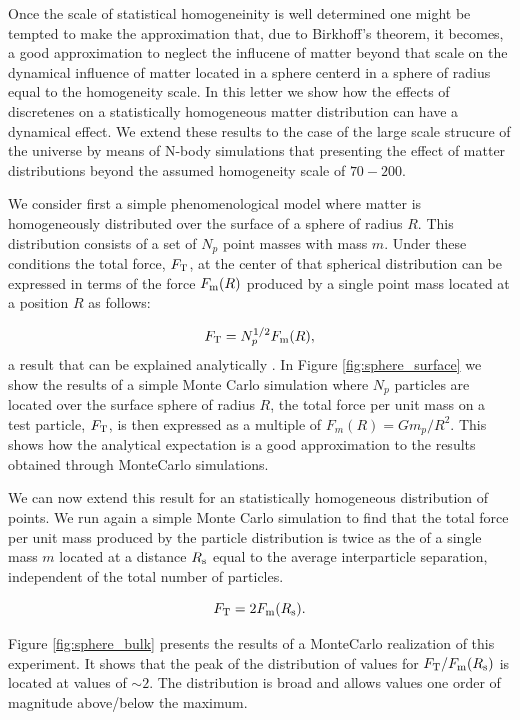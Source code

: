 \documentclass{article}
\newcommand{\hMpc}{{\ifmmode{h^{-1}{\rm Mpc}}\else{$h^{-1}$Mpc }\fi}}
\begin{document}
Once the scale of statistical homogeneinity is well determined one
might be tempted to make the approximation that,
due to Birkhoff's theorem, it becomes, a good approximation to neglect
the influcene of matter beyond that scale on the dynamical influence
of matter located in a sphere centerd in a sphere of radius equal to
the homogeneity scale.  In this letter we show how the effects of
discretenes on a statistically homogeneous matter distribution can
have a dynamical effect. We extend these results to the case of the
large scale strucure of the universe by means of N-body simulations
that presenting the effect of matter distributions beyond the assumed
homogeneity scale of $70-200$\hMpc.
 


 We consider first a simple phenomenological model where matter is
homogeneously distributed over the surface of a sphere of radius
$R$. This distribution consists of a set of $N_p$ point masses with mass
$m$. Under these conditions the total force, $F_{\rm T}$, at the
center of that spherical distribution can be expressed in terms of the
force $F_{\rm m}(R)$ produced by a single point mass located at a
position  $R$ as follows:  

\begin{equation}
F_{\rm T } = N_p^{1/2} F_{\rm m} (R),
\end{equation}
%
a result that can be explained analytically
\cite{Chandra43,Carati2008}. In Figure \ref{fig:sphere_surface} we
show the results of a simple Monte Carlo simulation where $N_p$
particles are located over the surface sphere of radius $R$, the total force per
unit mass on a test particle, $F_{\rm T}$, is then expressed as a
multiple of $F_{m}(R)=Gm_p/R^2$. This shows how the analytical
expectation is a good approximation to the results obtained through
MonteCarlo simulations.




We can now extend this result for an statistically homogeneous distribution
of points. We run again a simple Monte Carlo simulation to find that the total force per unit mass produced by the particle distribution is twice as
the of a single mass $m$ located at a distance $R_{\rm s}$ equal to
the average interparticle separation, independent of the total number of
particles. 

\begin{equation}
F_{\rm T} = 2 F_{\rm m}(R_{\rm s}).
\end{equation}

Figure \ref{fig:sphere_bulk} presents the results of a MonteCarlo
realization of this experiment. It shows that the peak of the
distribution of values for $F_{\rm T}/F_{\rm m}(R_{\rm s})$ is
located at values of $\sim 2$. The distribution is broad and allows
values one order of magnitude above/below the maximum. 
\end{document}
